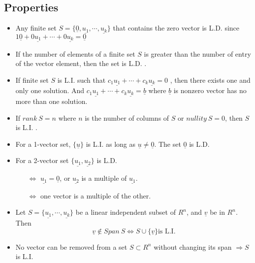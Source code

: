 \documentclass[12pt]{article}
\begin{document}
\subsection{Properties}
\begin{itemize}
\item Any finite set $S=\lbrace \underline{0},\underline{u_1}, \cdots, \underline{u_k}\rbrace$ that contains the zero vector is L.D. since $1\underline{0}+0\underline{u_1}+\cdots+0\underline{u_k}=\underline{0}$
\item If the number of elements of a finite set $S$ is greater than the number of entry of the vector element, then the set is L.D. .
\item If finite set $S$ is L.I. such that $c_1\underline{u_1} + \cdots + c_k\underline{u_k} = 0$ , then there exists one and only one solution. And $c_1\underline{u_1} + \cdots + c_k\underline{u_k} = \underline{b}$ where $\underline{b}$ is nonzero vector has no more than one solution.
\item If $rank\ S=n$ where $n$ is the number of columns of $S$ or $nullity\ S = 0$, then $S$ is L.I. .
\item For a 1-vector set, $\lbrace \underline{u}\rbrace$ is L.I. as long as $\underline{u}\neq \underline{0}$. The set $\underline{0}$ is L.D.
\item For a 2-vector set $\lbrace \underline{u_1}, \underline{u_2}\rbrace$ is L.D.
\begin{itemize}
\item[$\Leftrightarrow$] $\underline{u_1}=\underline{0}$, or $\underline{u_2}$ is a multiple of $\underline{u_1}$.
\item[$\Leftrightarrow$] one vector is a multiple of the other.
\end{itemize}
\item Let $S=\lbrace \underline{u_1},\cdots,\underline{u_k}\rbrace$ be a linear independent subset of $R^n$, and $\underline{v}$ be in $R^n$. Then
$$\underline{v}\notin Span\ S \Leftrightarrow S \cup \lbrace \underline{v}\rbrace \text{is L.I.}$$
\item No vector can be removed from a set $S \subset R^n$ without changing its span $\Rightarrow S$ is L.I.
\end{itemize}
\end{document}
